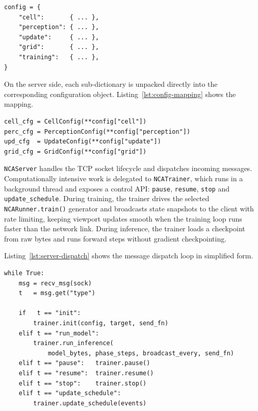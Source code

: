 \begin{lstlisting}[style=py, caption={Top-level configuration structure
exchanged between Blender and the training server.},
label={lst:config-structure}]
config = {
    "cell":       { ... },
    "perception": { ... },
    "update":     { ... },
    "grid":       { ... },
    "training":   { ... },
}
\end{lstlisting}

On the server side, each sub-dictionary is unpacked directly into the
corresponding configuration object. Listing~\ref{lst:config-mapping} shows
the mapping.

\begin{lstlisting}[style=py, caption={Mapping a configuration dictionary to
component configuration objects.}, label={lst:config-mapping}]
cell_cfg = CellConfig(**config["cell"])
perc_cfg = PerceptionConfig(**config["perception"])
upd_cfg  = UpdateConfig(**config["update"])
grid_cfg = GridConfig(**config["grid"])
\end{lstlisting}

\texttt{NCAServer} handles the TCP socket lifecycle and dispatches incoming
messages. Computationally intensive work is delegated to \texttt{NCATrainer},
which runs in a background thread and exposes a control API: \texttt{pause},
\texttt{resume}, \texttt{stop} and \texttt{update\_schedule}. During
training, the trainer drives the selected \texttt{NCARunner.train()} generator
and broadcasts state snapshots to the client with rate limiting, keeping
viewport updates smooth when the training loop runs faster than the network
link. During inference, the trainer loads a checkpoint from raw bytes and runs
forward steps without gradient checkpointing.

Listing~\ref{lst:server-dispatch} shows the message dispatch loop in
simplified form.

\begin{lstlisting}[style=py, caption={Server-side message dispatch loop
(simplified).}, label={lst:server-dispatch}]
while True:
    msg = recv_msg(sock)
    t   = msg.get("type")

    if   t == "init":
        trainer.init(config, target, send_fn)
    elif t == "run_model":
        trainer.run_inference(
            model_bytes, phase_steps, broadcast_every, send_fn)
    elif t == "pause":   trainer.pause()
    elif t == "resume":  trainer.resume()
    elif t == "stop":    trainer.stop()
    elif t == "update_schedule":
        trainer.update_schedule(events)
\end{lstlisting}

